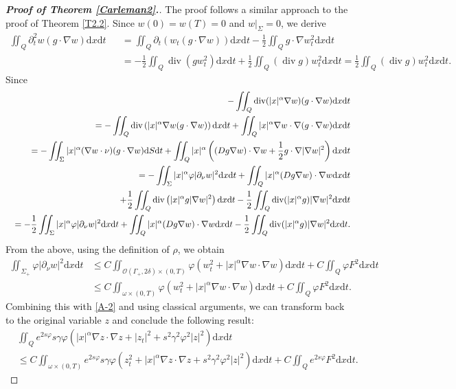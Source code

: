 \documentclass[11pt]{article}
\numberwithin{equation}{section}
\def\pt{\partial}
\def\vp{\varphi}
\def\bf{\textbf}
\def\pt{\partial}
\def\om{\omega}
\def\al{\alpha}
\def\de{\delta}
\def\ga{\gamma}
\def\Ga{\Gamma}
\def\ts{\times}
\def\f{\frac}
\def\df{\mathrm d}
\def\mcO{\mathcal{O}}
\DeclareMathOperator{\Div}{div}
\begin{document}
\begin{proof}[{\rm \bf { Proof of  Theorem \ref{Carleman2}.}}]
			
			The proof follows a similar approach to the proof of Theorem \ref{T2.2}. Since
			$w(0)=w(T)=0$ and $w|_{\Sigma}=0$,  we derive
			\begin{eqnarray*}
				\iint_Q \pt_t^2 w(g\cdot \nabla w)\df x\df t
				&&=\iint_Q\pt_t\left(w_t(g\cdot \nabla w)\right)\df x\df t-\f{1}{2}\iint_Qg\cdot \nabla w_t^2\df x\df t \\
				&&=-\f{1}{2}\iint_Q \Div(g w_t^2)\df x\df t+\f{1}{2}\iint_Q (\Div g) w_t^2\df x\df t =\f{1}{2}\iint_Q (\Div g) w_t^2\df x\df t.
			\end{eqnarray*}
			Since
			\begin{eqnarray*}
				&&-\iint_Q\Div(|x|^\al \nabla w)(g\cdot \nabla w)\df x\df t\\
				&&=-\iint_Q\Div\left(|x|^\al \nabla w (g\cdot \nabla w)\right)\df x\df t+\iint_Q|x|^\al \nabla w\cdot \nabla (g\cdot \nabla w)\df x\df t\\
				&&=-\iint_\Sigma |x|^\al (\nabla w\cdot \nu)(g\cdot \nabla w)\df S\df t+\iint_Q |x|^\al \left((Dg\nabla w)\cdot \nabla w+\f{1}{2} g\cdot \nabla |\nabla w|^2\right)\df x\df t\\
				&&=-\iint_{\Sigma} |x|^\al \vp |\pt_\nu w|^2\df x\df t+ \iint_Q |x|^\al (Dg\nabla w)\cdot \nabla w\df x\df t\\
				&&\hspace{4.5mm}+\f{1}{2}\iint_Q\Div\left(|x|^\al g|\nabla w|^2\right)\df x\df t-\f{1}{2}\iint_Q \Div(|x|^\al g)|\nabla w|^2\df x\df t\\
				&&=-\f{1}{2}\iint_{\Sigma} |x|^\al \vp |\pt_\nu w|^2\df x\df t+ \iint_Q |x|^\al (Dg\nabla w)\cdot \nabla w\df x\df t-\f{1}{2}\iint_Q \Div(|x|^\al g)|\nabla w|^2\df x\df t.
			\end{eqnarray*}
			From the above, using the definition of $\rho$, we obtain
			\begin{equation}\label{10.03.7}
				\begin{split}
					\iint_{\Sigma_+} \vp|\pt_\nu w|^2\df x\df t
					&\leq C\iint_{\mcO(\Ga_+,2\de)\ts (0,T)} \vp\left(w_t^2+|x|^\al \nabla w\cdot \nabla w\right)\df x\df t+C\iint_Q\vp F^2\df x\df t\\
					&\leq C\iint_{\om\ts (0,T)}\vp\left(w_t^2+|x|^\al \nabla w\cdot \nabla w\right)\df x\df t+C\iint_Q\vp F^2\df x\df t.
				\end{split}
			\end{equation}
			Combining this with \eqref{A-2} and using classical arguments, we can transform back to the original variable $z$ and conclude the following result:
			\begin{equation}\label{4.5}
				\begin{split}
					&\iint_Qe^{2s\vp}s\ga \vp \left(|x|^\al \nabla z\cdot \nabla z+|z_t|^2+s^2\ga^2\vp^2|z|^2\right)\df x\df t\\
					&\leq C\iint_{\om\ts (0,T)}e^{2s\vp}s\ga \vp\left( z_t^2+|x|^\al \nabla z\cdot \nabla z +s^2\ga^2\vp^2|z|^2 \right)\df x\df t+C\iint_Qe^{2s\vp} F^2\df x\df t.
				\end{split}
			\end{equation}
			

\end{proof}
\end{document}
